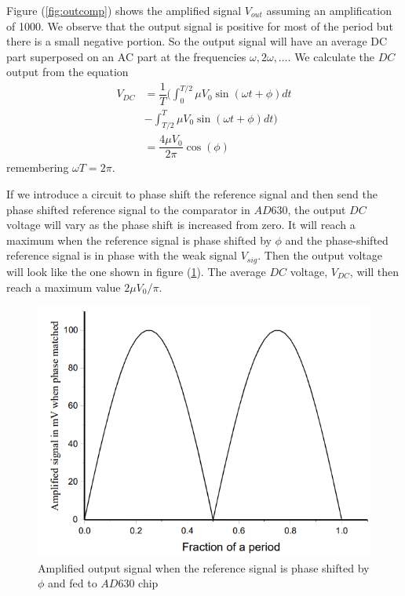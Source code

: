 \documentclass[%
 reprint,
nofootinbib,
 amsmath,amssymb,
 aps,
]{revtex4-2}
\begin{document}
    Figure (\ref{fig:outcomp}) shows the amplified signal $V_{out}$ assuming an amplification of 1000. We observe that the output signal is positive for most of the period but there is a small negative portion. So the output signal will have an average DC part superposed on an AC part at the frequencies $\omega, 2 \omega, \ldots$. We calculate the $DC$ output from the equation
    \begin{equation}
        \begin{split}
            V_{DC}
            &= \dfrac{1}{T} \Bigg( \int_{0}^{T/2} \mu V_0 \sin (\omega t + \phi) dt \\ 
            &- \int_{T/2}^{T} \mu V_0 \sin (\omega t + \phi) dt \Bigg) \\
            &= \dfrac{4 \mu V_0}{2 \pi} \cos (\phi)
        \end{split}
    \end{equation}
    remembering $\omega T = 2 \pi$.
    \par
    If we introduce a circuit to phase shift the reference signal and then send the phase shifted reference signal to the comparator in $AD630$, the output $DC$ voltage will vary as the phase shift is increased from zero. It will reach a maximum when the reference signal is phase shifted by $\phi$ and the phase-shifted reference signal is in phase with the weak signal $V_{sig}$. Then the output voltage will look like the one shown in figure (\ref{fig:outad630}). The average $DC$ voltage, $V_{DC}$, will then reach a maximum value $2 \mu V_0 / \pi$.
    \begin{figure}
        \centering
        \includegraphics[scale = 0.6]{Figures/ampoutputAD630.png}
        \caption{Amplified output signal when the reference signal is phase shifted by $\phi$ and fed to $AD630$ chip}
        \label{fig:outad630}
    \end{figure}
\end{document}
